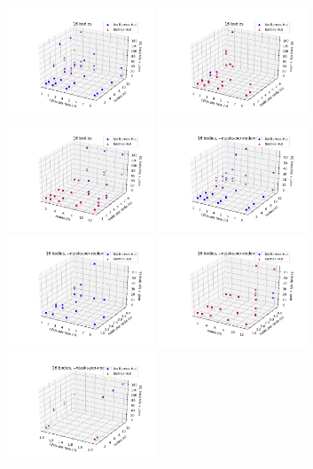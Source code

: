 \documentclass[11pt,a4paper]{article}
\begin{document}
\includegraphics[width=4.4cm]{16-cpusPerTask-nodes}
\includegraphics[width=4.4cm]{16-cpusPerTask-tasksPerNode}
\includegraphics[width=4.4cm]{16-nodes-tasksPerNode}
\includegraphics[width=4.4cm]{16-cpusPerTask-nodes-elide_8_tpn}
\includegraphics[width=4.4cm]{16-cpusPerTask-tasksPerNode-elide_8_tpn}
\includegraphics[width=4.4cm]{16-nodes-tasksPerNode-elide_8_tpn}
\includegraphics[width=4.4cm]{16-cpusPerTask-nodes-just_1_tpn}
\end{document}
